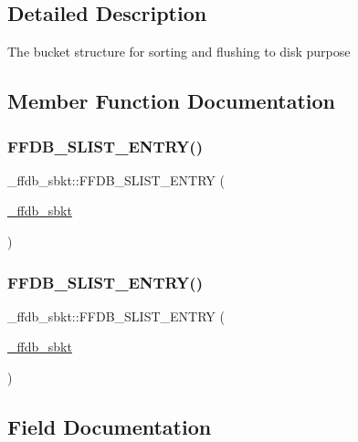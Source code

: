 \subsection{Detailed Description}
The bucket structure for sorting and flushing to disk purpose 

\subsection{Member Function Documentation}
\mbox{\label{struct__ffdb__sbkt_a63f40d019cc51c813c024f7939999003}} 
\subsubsection{\texorpdfstring{FFDB\_SLIST\_ENTRY()}{FFDB\_SLIST\_ENTRY()}\hspace{0.1cm}{\footnotesize\ttfamily [1/2]}}
{\footnotesize\ttfamily \+\_\+ffdb\+\_\+sbkt\+::\+F\+F\+D\+B\+\_\+\+S\+L\+I\+S\+T\+\_\+\+E\+N\+T\+RY (\begin{DoxyParamCaption}\item[{\mbox{\hyperlink{struct__ffdb__sbkt}{\+\_\+ffdb\+\_\+sbkt}}}]{ }\end{DoxyParamCaption})}

\mbox{\label{struct__ffdb__sbkt_a63f40d019cc51c813c024f7939999003}} 
\subsubsection{\texorpdfstring{FFDB\_SLIST\_ENTRY()}{FFDB\_SLIST\_ENTRY()}\hspace{0.1cm}{\footnotesize\ttfamily [2/2]}}
{\footnotesize\ttfamily \+\_\+ffdb\+\_\+sbkt\+::\+F\+F\+D\+B\+\_\+\+S\+L\+I\+S\+T\+\_\+\+E\+N\+T\+RY (\begin{DoxyParamCaption}\item[{\mbox{\hyperlink{struct__ffdb__sbkt}{\+\_\+ffdb\+\_\+sbkt}}}]{ }\end{DoxyParamCaption})}



\subsection{Field Documentation}
\mbox{\label{struct__ffdb__sbkt_a4c73840977db69d77ee2501433a30df0}} 
